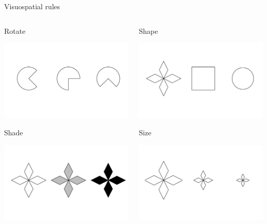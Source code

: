 \documentclass{beamer}
\begin{document}
\begin{frame}{Visuospatial rules}
\begin{columns}[T]
	\begin{column}{.50\linewidth}
		\centering
		Rotate 
		
		\includegraphics[width=.7\linewidth]{img/rotate.pdf}
		
		Shade
		
		\includegraphics[width=.7\linewidth]{img/shade.pdf}
	\end{column}
	
	\begin{column}{.50\linewidth}
		\centering
		Shape 
		
		\includegraphics[width=.7\linewidth]{img/shape.pdf}
		
		Size
		
		\includegraphics[width=.7\linewidth]{img/size.pdf}
	\end{column}
\end{columns}
	

\end{frame}
\end{document}
